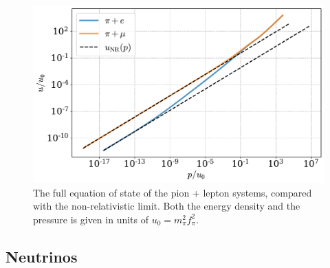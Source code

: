 \begin{figure}[h]
    \centering
    \includegraphics[width=.7\textwidth]{../scripts/figurer/charge_neutrality/eos_lim.pdf}
    \caption{
        The full equation of state of the pion + lepton systems, compared with the non-relativistic limit.
        Both the energy density and the pressure is given in units of $u_0 = m_\pi^2 f_\pi^2$.
    }
    \label{fig: lepton eos limit}
\end{figure}




\subsection{Neutrinos}
\label{subsection: neutrinos}

